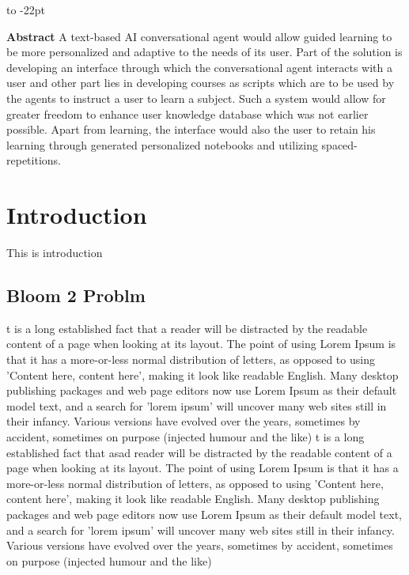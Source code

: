 \documentclass[]{article}
\makeatletter
\def\author#1{\gdef\@author{\hskip-\dimexpr(\tabcolsep)\hskip1pt\parbox{\dimexpr\textwidth-1pt}{\bfseries\raggedright \textit{#1}}}}
\def\title#1{\gdef\@title{\raggedright\bfseries\def\baselinestretch{1}\selectfont\selectfont#1}}
\renewenvironment{abstract}
{\hspace*{-15pc}\vspace*{-3.3pc}\vbox to -22pt \bgroup\begin{minipage}{1.7in}{\fontsize{8}{10}\selectfont\addtocontents{toc}{\protect\setcounter{tocdepth}{-1}}\tableofcontents\addtocontents{toc}{\protect\setcounter{tocdepth}{2}}}\vspace{1cm}\end{minipage}\egroup\vspace*{-.4pc}\trivlist\item[]\leftskip1pt\hfill\hfill\mbox{\null}\par\noindent\ignorespaces\color{black} }{\par\noindent\endtrivlist}
\makeatother
\begin{document}
\def\authorCount{0}
\def\affCount{0}

\def\journalTitle{White Paper- Primerlabs}

\title{An incremental approach for building a dialog based intelligent agent for guided learning.}
\author{Siddharth Kanungo}


\maketitle 
\def\RunningTitle{{An incremental approach for building a dialog based intelligent agent for guided learning.}}

\begin{abstract}
  \textbf{Abstract}
  A text-based AI conversational agent would allow guided learning to be more personalized and adaptive to the needs of its user. Part of the solution is developing an interface through which the conversational agent interacts with a user and other part lies in developing courses as scripts which are to be used by the agents to instruct a user to learn a subject. Such a system would allow for greater freedom to enhance user knowledge database which was not earlier possible. Apart from learning, the interface would also the user to retain his learning through generated personalized notebooks and utilizing spaced-repetitions.
\end{abstract}
    
\section{Introduction}

 This is introduction\unskip~\cite{zappella}
\subsection{Bloom 2 Problm}
 t is a long established fact that a reader will be distracted by the readable content of a page when looking at its layout. The point of using Lorem Ipsum is that it has a more-or-less normal distribution of letters, as opposed to using 'Content here, content here', making it look like readable English. Many desktop publishing packages and web page editors now use Lorem Ipsum as their default model text, and a search for 'lorem ipsum' will uncover many web sites still in their infancy. Various versions have evolved over the years, sometimes by accident, sometimes on purpose (injected humour and the like)
 t is a long established fact that asad reader will be distracted by the readable content of a page when looking at its layout. The point of using Lorem Ipsum is that it has a more-or-less normal distribution of letters, as opposed to using 'Content here, content here', making it look like readable English. Many desktop publishing packages and web page editors now use Lorem Ipsum as their default model text, and a search for 'lorem ipsum' will uncover many web sites still in their infancy. Various versions have evolved over the years, sometimes by accident, sometimes on purpose (injected humour and the like)
\end{document}
